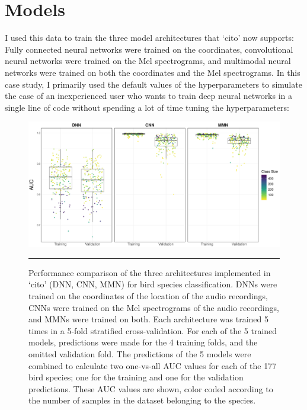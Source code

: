 \documentclass[12pt,twoside]{scrreport}
\newcommand{\pkg}[1]{`#1'}
\begin{document}
\section*{Models}
I used this data to train the three model architectures that \pkg{cito} now supports: Fully connected neural networks were trained on the coordinates, convolutional neural networks were trained on the Mel spectrograms, and multimodal neural networks were trained on both the coordinates and the Mel spectrograms. In this case study, I primarily used the default values of the hyperparameters to simulate the case of an inexperienced user who wants to train deep neural networks in a single line of code without spending a lot of time tuning the hyperparameters:

\begin{figure}[p]
	\includegraphics[width=\textwidth]{../analysis/results/figures/auc_beehive.pdf}
	\caption{Performance comparison of the three architectures implemented in \pkg{cito} (DNN, CNN, MMN) for bird species classification. DNNs were trained on the coordinates of the location of the audio recordings, CNNs were trained on the Mel spectrograms of the audio recordings, and MMNs were trained on both. Each architecture was trained 5 times in a 5-fold stratified cross-validation. For each of the 5 trained models, predictions were made for the 4 training folds, and the omitted validation fold. The predictions of the 5 models were combined to calculate two one-vs-all AUC values for each of the 177 bird species; one for the training and one for the validation predictions. These AUC values are shown, color coded according to the number of samples in the dataset belonging to the species.}
	\label{beehive}
	\rule{\textwidth}{1pt} 
	\newline
	\resizebox{\textwidth}{!}{\usebox{\dnn}}
	\resizebox{\textwidth}{!}{\usebox{\cnn}}
\end{figure}
\end{document}
